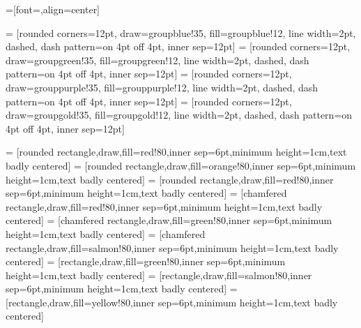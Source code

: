

=[font=\sffamily,align=center]

\newcommand{\fillOpacity}{80}

\newcommand{\compShape}{rectangle}
\newcommand{\groupShape}{chamfered rectangle}
\newcommand{\procShape}{rounded rectangle}

\newcommand{\explicitColor}{green}
\newcommand{\implicitColor}{salmon}
\newcommand{\optimizationColor}{red} %


 = [rounded corners=12pt, draw=groupblue!35, fill=groupblue!12, line width=2pt, dashed, dash pattern=on 4pt off 4pt, inner sep=12pt]
 = [rounded corners=12pt, draw=groupgreen!35, fill=groupgreen!12, line width=2pt, dashed, dash pattern=on 4pt off 4pt, inner sep=12pt]
 = [rounded corners=12pt, draw=grouppurple!35, fill=grouppurple!12, line width=2pt, dashed, dash pattern=on 4pt off 4pt, inner sep=12pt]
 = [rounded corners=12pt, draw=groupgold!35, fill=groupgold!12, line width=2pt, dashed, dash pattern=on 4pt off 4pt, inner sep=12pt]

 = [\procShape,draw,fill=\optimizationColor!\fillOpacity,inner sep=6pt,minimum height=1cm,text badly centered]
 = [\procShape,draw,fill=orange!\fillOpacity,inner sep=6pt,minimum height=1cm,text badly centered]
 = [\procShape,draw,fill=\optimizationColor!\fillOpacity,inner sep=6pt,minimum height=1cm,text badly centered]
 = [\groupShape,draw,fill=\optimizationColor!\fillOpacity,inner sep=6pt,minimum height=1cm,text badly centered]
 = [\groupShape,draw,fill=\explicitColor!\fillOpacity,inner sep=6pt,minimum height=1cm,text badly centered]
 = [\groupShape,draw,fill=\implicitColor!\fillOpacity,inner sep=6pt,minimum height=1cm,text badly centered]
 = [\compShape,draw,fill=\explicitColor!\fillOpacity,inner sep=6pt,minimum height=1cm,text badly centered]
 = [\compShape,draw,fill=\implicitColor!\fillOpacity,inner sep=6pt,minimum height=1cm,text badly centered]
 = [\compShape,draw,fill=yellow!\fillOpacity,inner sep=6pt,minimum height=1cm,text badly centered]

